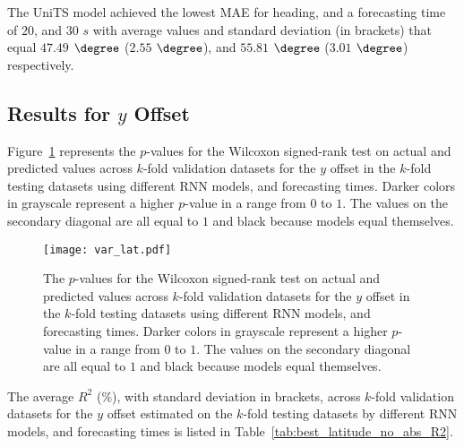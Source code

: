 The UniTS model achieved the lowest MAE for heading, and a forecasting time of $20$, and $30$ $s$ with average values and standard deviation (in brackets) that equal $47.49$ $\degree$ ($2.55$ $\degree$), and $55.81$ $\degree$ ($3.01$ $\degree$) respectively.

\subsection{Results for $y$ Offset}

Figure~\ref{fig:var_lat} represents the $p$-values for the Wilcoxon signed-rank test on actual and predicted values across $k$-fold validation datasets for the $y$ offset in the $k$-fold testing datasets using different RNN models, and forecasting times. Darker colors in grayscale represent a higher $p$-value in a range from $0$ to $1$. The values on the secondary diagonal are all equal to $1$ and black because models equal themselves.

\begin{figure}[!ht]
	\centering
	\texttt{[image: var\_lat.pdf]}
	\caption{The $p$-values for the Wilcoxon signed-rank test on actual and predicted values across $k$-fold validation datasets for the $y$ offset in the $k$-fold testing datasets using different RNN models, and forecasting times. Darker colors in grayscale represent a higher $p$-value in a range from $0$ to $1$. The values on the secondary diagonal are all equal to $1$ and black because models equal themselves.}
	\label{fig:var_lat}
\end{figure}

The average $R^{2}$ (\%), with standard deviation in brackets, across $k$-fold validation datasets for the $y$ offset estimated on the $k$-fold testing datasets by different RNN models, and forecasting times is listed in Table~\ref{tab:best_latitude_no_abs_R2}.

